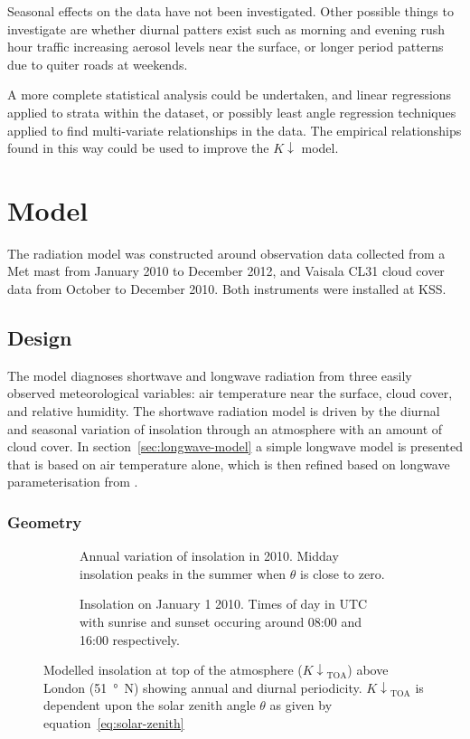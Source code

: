 \documentclass[a4paper,titlepage, twoside]{report}
\newcommand\Kdown{K\!\!\downarrow}
\newcommand\Kdowntoa{{K\!\!\downarrow}_\mathrm{TOA}}
\begin{document}
Seasonal effects on the data have not been investigated. Other possible things to investigate are whether diurnal patters exist such as morning and evening rush hour traffic increasing aerosol levels near the surface, or longer period patterns due to quiter roads at weekends.

A more complete statistical analysis could be undertaken, and linear regressions applied to strata within the dataset, or possibly least angle regression techniques applied to find multi-variate relationships in the data. The empirical relationships found in this way could be used to improve the $\Kdown$ model.


\chapter{Model}
The radiation model was constructed around observation data collected from a Met mast from January 2010 to December 2012, and Vaisala CL31 cloud cover data from October to December 2010.  Both instruments were installed at KSS.

\section{Design}
The model diagnoses shortwave and longwave radiation from three easily observed meteorological variables: air temperature near the surface, cloud cover, and relative humidity.  The shortwave radiation model is driven by the diurnal and seasonal variation of insolation through an atmosphere with an amount of cloud cover.  In section~\ref{sec:longwave-model} a simple longwave model is presented that is based on air temperature alone, which is then refined based on longwave parameterisation from \cite{loridan}.

\subsection{Geometry}
\begin{figure}
\centering
\begin{subfigure}{0.52\textwidth}
\hspace{-1em}

\caption{Annual variation of insolation in 2010.  Midday insolation peaks in the summer when $\theta$ is close to zero.}
\end{subfigure}
\hfill
\begin{subfigure}{0.4\textwidth}
\hspace{-2.2em}

\caption{Insolation on January 1 2010.  Times of day in UTC with sunrise and sunset occuring around 08:00 and 16:00 respectively.}
\end{subfigure}
\caption{Modelled insolation at top of the atmosphere ($\Kdowntoa$) above London (\SI{51}{\degree N}) showing annual and diurnal periodicity.  $\Kdowntoa$ is dependent upon the solar zenith angle $\theta$ as given by equation~\ref{eq:solar-zenith}}
\label{fig:toa-model}
\end{figure}
\end{document}
